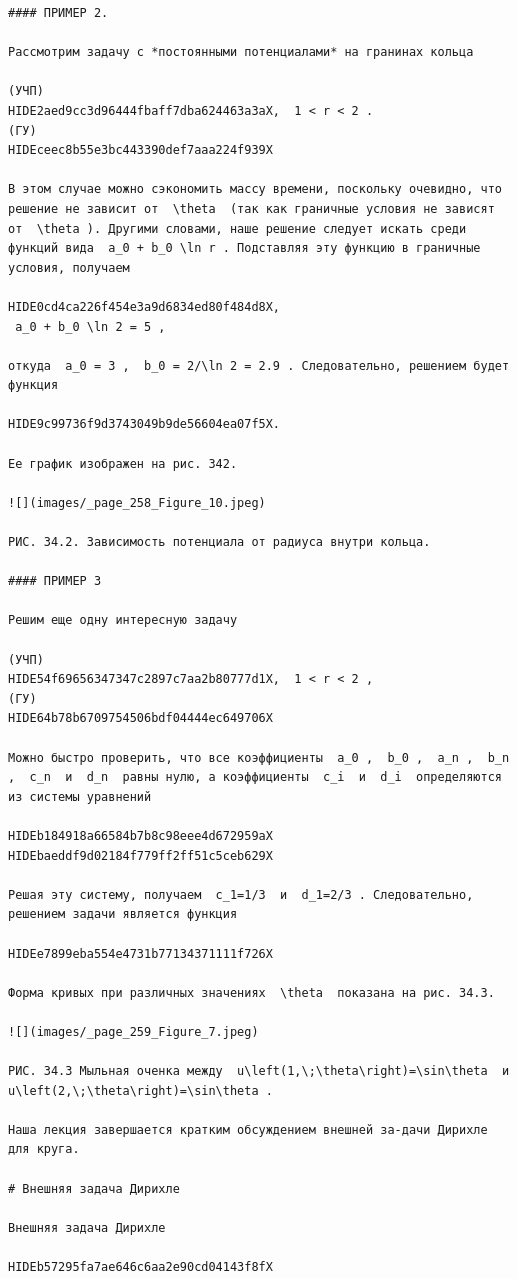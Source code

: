 \documentclass[
  ukrainian,
]{article}
\begin{document}
\begin{verbatim}
#### ПРИМЕР 2.

Рассмотрим задачу с *постоянными потенциалами* на гранинах кольца

(УЧП) 
HIDE2aed9cc3d96444fbaff7dba624463a3aX,  1 < r < 2 .  
(ГУ) 
HIDEceec8b55e3bc443390def7aaa224f939X

В этом случае можно сэкономить массу времени, поскольку очевидно, что решение не зависит от  \theta  (так как граничные условия не зависят от  \theta ). Другими словами, наше решение следует искать среди функций вида  a_0 + b_0 \ln r . Подставляя эту функцию в граничные условия, получаем

HIDE0cd4ca226f454e3a9d6834ed80f484d8X,  
 a_0 + b_0 \ln 2 = 5 ,

откуда  a_0 = 3 ,  b_0 = 2/\ln 2 = 2.9 . Следовательно, решением будет функция

HIDE9c99736f9d3743049b9de56604ea07f5X.

Ее график изображен на рис. 342.

![](images/_page_258_Figure_10.jpeg)

РИС. 34.2. Зависимость потенциала от радиуса внутри кольца.

#### ПРИМЕР 3

Решим еще одну интересную задачу

(УЧП) 
HIDE54f69656347347c2897c7aa2b80777d1X,  1 < r < 2 ,  
(ГУ) 
HIDE64b78b6709754506bdf04444ec649706X

Можно быстро проверить, что все коэффициенты  a_0 ,  b_0 ,  a_n ,  b_n ,  c_n  и  d_n  равны нулю, а коэффициенты  c_i  и  d_i  определяются из системы уравнений

HIDEb184918a66584b7b8c98eee4d672959aX HIDEbaeddf9d02184f779ff2ff51c5ceb629X

Решая эту систему, получаем  c_1=1/3  и  d_1=2/3 . Следовательно, решением задачи является функция

HIDEe7899eba554e4731b77134371111f726X

Форма кривых при различных значениях  \theta  показана на рис. 34.3.

![](images/_page_259_Figure_7.jpeg)

РИС. 34.3 Мыльная оченка между  u\left(1,\;\theta\right)=\sin\theta  и  u\left(2,\;\theta\right)=\sin\theta .

Наша лекция завершается кратким обсуждением внешней за-дачи Дирихле для круга.

# Внешняя задача Дирихле

Внешняя задача Дирихле

HIDEb57295fa7ae646c6aa2e90cd04143f8fX


\end{verbatim}
\end{document}
